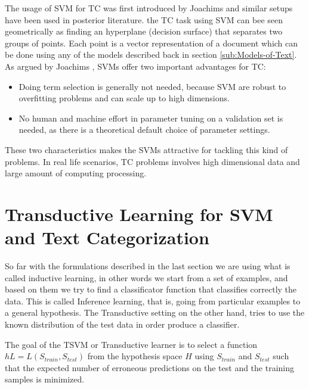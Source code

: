 The usage of SVM for TC  was first introduced by Joachims \cite{Joachims98,Joachims99c}
and similar setups have been used in posterior literature\cite{DumaisPHS98}.
the TC task using SVM can bee seen geometrically as finding an hyperplane
(decision surface) that separates two groups of points. Each point
is a vector representation of a document which can be done using any
of the models described back in section \ref{sub:Models-of-Text}.
As argued by Joachims \cite{Joachims98}, SVMs offer two important
advantages for TC:

\begin{itemize}
\item Doing term selection is generally not needed, because SVM are robust
to overfitting problems and can scale up to high dimensions.
\item No human and machine effort in parameter tuning on a validation set
is needed, as there is a theoretical default choice of parameter settings.
\end{itemize}
These two characteristics makes the SVMs attractive for tackling this
kind of problems. In real life scenarios, TC problems involves high
dimensional data and large amount of computing processing. 

\section{Transductive Learning for SVM and Text Categorization\label{sub:Transductive-Learning-for}}

So far with the formulations described in the last section we are
using what is called inductive learning, in other words we start from
a set of examples, and based on them we try to find a classificator
function that classifies correctly the data. This is called Inference
learning, that is, going from particular examples to a general hypothesis.
The Transductive setting on the other hand, tries to use the known
distribution of the test data in order produce a classifier. 

The goal of the TSVM or Transductive learner is to select a function
$hL=L(S_{train},S_{test})$ from the hypothesis space $H$ using $S_{train}$
and $S_{test}$ such that the expected number of erroneous predictions
on the test and the training samples is minimized. 

